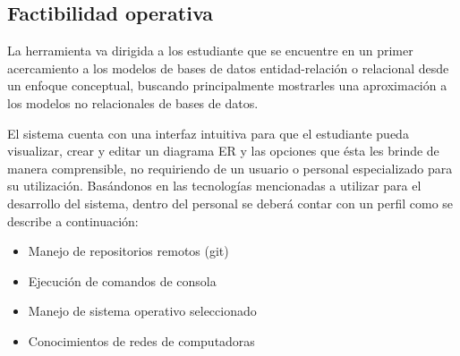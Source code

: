 
\subsection*{Factibilidad operativa}


La herramienta va dirigida a los estudiante que se encuentre en un primer acercamiento a los modelos de bases de datos entidad-relación o relacional desde un enfoque conceptual, buscando principalmente mostrarles una aproximación a los modelos no relacionales de bases de datos.

El sistema cuenta con una interfaz intuitiva para que el estudiante pueda visualizar, crear y editar un diagrama ER y las opciones que ésta les brinde de manera comprensible, no requiriendo de un usuario o personal especializado para su utilización. Basándonos en las tecnologías mencionadas a utilizar para el desarrollo del sistema, dentro del personal se deberá contar con un perfil como se describe a continuación:

\begin{itemize}
    \item Manejo de repositorios remotos (git)
    \item Ejecución de comandos de consola
    \item Manejo de sistema operativo seleccionado
    \item Conocimientos de redes de computadoras
\end{itemize}